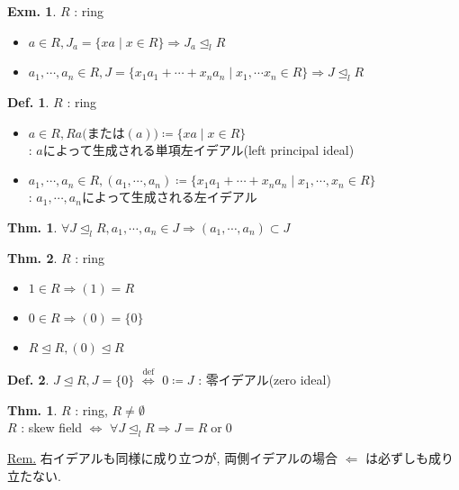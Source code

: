 \documentclass[uplatex,dvipdfmx,9pt]{beamer}
\newcommand{\defarrow}{\overset{\mathrm{def}}{\Leftrightarrow}}
\newcommand{\lideal}{\trianglelefteq_l}
\newcommand{\ideal}{\trianglelefteq}
\newcounter{textThmCount}
\newcounter{textExmCount}
\theoremstyle{definition} %
\newtheorem{defn}{Def.}[subsection] %
\newtheorem{thm}{Thm.}[subsection] %
\newtheorem{thmText}[textThmCount]{Thm.}
\theoremstyle{example}
\newtheorem{exmText}[textExmCount]{Exm.}
\begin{document}
\begin{frame}

  \begin{exmText}
    $R$ : ring
    \begin{itemize}
      \item $a \in R, J_a = \{xa \mid x \in R\} \Rightarrow J_a \lideal R$
      \item $a_1, \cdots, a_n \in R, J = \{x_1a_1 + \cdots + x_na_n \mid x_1, \cdots x_n \in R\} \Rightarrow J \lideal R$
    \end{itemize}
  \end{exmText}

  \begin{defn}
    $R$ : ring
    \begin{itemize}
      \item $a \in R, Ra \text{(または$(a)$)} \coloneqq \{xa \mid x \in R\}$ \\
            : $a$によって\alert{生成}される\alert{単項左イデアル(left principal ideal)}
      \item $a_1, \cdots, a_n \in R, (a_1, \cdots, a_n) \coloneqq \{x_1a_1 + \cdots + x_na_n \mid x_1, \cdots, x_n \in R\}$ \\
            : $a_1, \cdots, a_n$によって\alert{生成}される左イデアル
    \end{itemize}
  \end{defn}

  \begin{thm}
    $\forall J \lideal R, a_1, \cdots, a_n \in J \Rightarrow (a_1, \cdots, a_n) \subset J$
  \end{thm}

\end{frame}

\begin{frame}

  \begin{thm}
    $R$ : ring
    \begin{itemize}
      \item $1 \in R \Rightarrow (1) = R$
      \item $0 \in R \Rightarrow (0) = \{0\}$
      \item $R \ideal R, (0) \ideal R$
    \end{itemize}
  \end{thm}

  \begin{defn}
    $J \ideal R, J = \{0\}$ $\defarrow$ $0 \coloneqq J$ : \alert{零イデアル(zero ideal)}
  \end{defn}

  \begin{thmText}
    $R$ : ring, $R \neq \emptyset$ \\
    $R$ : skew field $\Leftrightarrow$ $\forall J \lideal R \Rightarrow J = R \; \text{or} \; 0$
  \end{thmText}
  \underline{Rem.} 右イデアルも同様に成り立つが, 両側イデアルの場合 $\Leftarrow$ は必ずしも成り立たない.

\end{frame}
\end{document}
